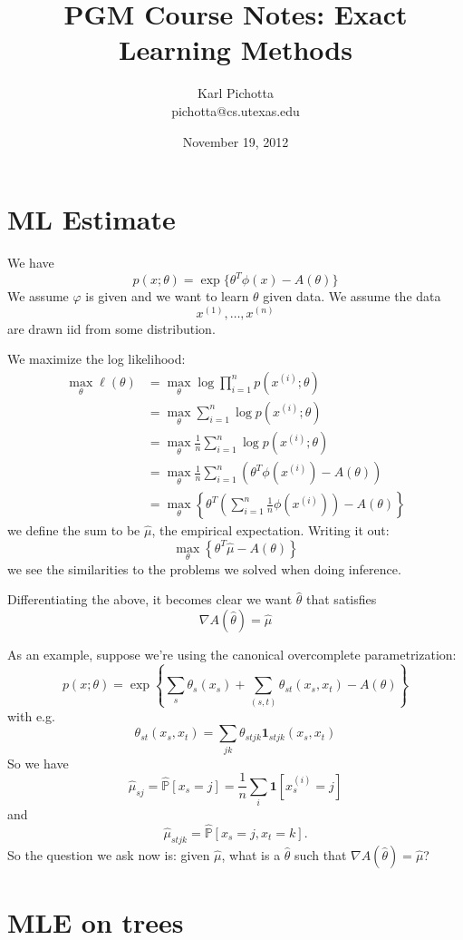 \documentclass{article}
\title{PGM Course Notes: Exact Learning Methods}
\author{Karl Pichotta \\ pichotta@cs.utexas.edu}
\date{November 19, 2012}
\begin{document}
\maketitle




\section{ML Estimate}

We have
$$
p(x;\theta ) = \exp\{\theta^T \phi(x) - A(\theta)\}
$$
We assume $\varphi$ is given and we want to learn $\theta$ given data.
We assume the data
$$
x^{(1)}, \ldots, x^{(n)}
$$
are drawn iid from some distribution.

We maximize the log likelihood:
\begin{align}
\max_\theta \ell(\theta) 
&= 
\max_\theta \log \prod_{i=1}^n p(x^{(i)};\theta)
\\
&= 
\max_\theta \sum_{i=1}^n \log p(x^{(i)};\theta)
\\
&= 
\max_\theta  \frac{1}{n} \sum_{i=1}^n \log p(x^{(i)};\theta)
\\
&=
\max_\theta  \frac{1}{n} \sum_{i=1}^n 
\left(
	\theta^T \phi(x^{(i)}) - A(\theta)
\right)
\\
&=
\max_\theta
\left\{
\theta^T \left(
\sum_{i=1}^n \frac{1}{n} \phi(x^{(i)})
\right)
- A(\theta)
\right\}
\end{align}
we define the sum to be $\hat\mu$, the empirical expectation.
Writing it out:
$$
\max_\theta
\left\{
\theta^T \hat\mu - A(\theta)
\right\}
$$
we see the similarities to the problems we solved when doing inference.

Differentiating the above, it becomes clear we want $\hat\theta$ that satisfies
$$
\nabla A(\hat\theta) = \hat\mu
$$

As an example, suppose we're using the canonical overcomplete parametrization:
$$
p(x;\theta) =
\exp\left\{
\sum_s \theta_s(x_s) + 
\sum_{(s,t)} \theta_{st}(x_s, x_t) - A(\theta)
\right\}
$$
with e.g.
$$
\theta_{st}(x_s,x_t) = \sum_{jk} \theta_{stjk} \mathbf 1 _{stjk}(x_s, x_t)
$$
So we have
$$
\hat\mu_{sj} = \hat{ \mathbb{P}}[x_s = j] = 
\frac{1}{n} \sum_i \mathbf 1[x_s^{(i)} = j]
$$
and
$$
\hat\mu_{stjk} = \hat{\mathbb P}[x_s = j, x_t = k].
$$
So the question we ask now is: given $\hat\mu$, what is a $\hat\theta$ such that $\nabla A(\hat\theta) = \hat\mu$?

\section{MLE on trees}
\end{document}
